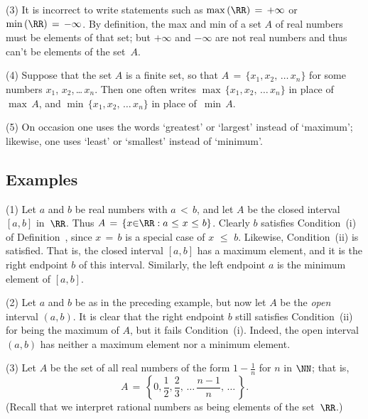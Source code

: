         (3) It is incorrect to write statements such as $\max\,({\RR}) \,=\, +{\infty}$ or $\min\,({\RR}) \,=\, -{\infty}$.
    By definition, the max and min of a set $A$ of real numbers must be elements of that set;
    but $+{\infty}$ and $-{\infty}$ are not real numbers and thus can't be elements of the set~$A$.

\V

        (4) Suppose that the set $A$ is a finite set, so that $A \,=\, \{x_{1}, x_{2}, \,{\ldots}\,x_{n}\}$
    for some numbers $x_{1}$, $x_{2}$,\,{\ldots}\,$x_{n}$. Then one often writes $\max\,\{x_{1}, x_{2},\,{\ldots}\,x_{n}\}$
    in place of~$\max\,A$, and $\min\,\{x_{1}, x_{2},\,{\ldots}\,x_{n}\}$ in place of~$\min\,A$.

\V

        (5) On occasion one uses the words `greatest' or `largest' instead of `maximum'; likewise, one uses `least' or `smallest' instead of `minimum'.

\V


\V
\V

            \subsection{\small{\bf Examples}}
            \label{ExampB30.80}

\V

\hspace*{\parindent}(1) Let $a$ and $b$ be real numbers with $a\,<\,b$, and let $A$ be the closed interval $[a,b]$ in~${\RR}$.
    Thus $A \,=\, \{x{\in}{\RR}: a\,\,{\leq}\,\,x\,\,{\leq}\,\,b\}$.
    Clearly $b$ satisfies Condition~(i) of Definition~, since $x \,=\, b$ is a special case of $x\,\,{\leq}\,\,b$.
    Likewise, Condition~(ii) is satisfied. That is, the closed interval $[a,b]$ has a maximum element, and it is the right endpoint $b$ of this interval.
    Similarly, the left endpoint $a$ is the minimum element of $[a,b]$.

\V

        (2) Let $a$ and $b$ be as in the preceding example, but now let $A$ be the {\em open} interval $(a,b)$.
    It is clear that the right endpoint $b$ still satisfies Condition~(ii) for being the maximum of $A$, but it fails Condition~(i).
    Indeed, the open interval $(a,b)$ has neither a maximum element nor a minimum element.

\V

        (3) Let $A$ be the set of all real numbers of the form ${\displaystyle 1-\frac{1}{n}}$ for $n$ in ${\NN}$;
    that is,
        \begin{displaymath}
        A \,=\, \left\{{\displaystyle 0, \frac{1}{2}, \frac{2}{3},\,{\ldots}\,\frac{n-1}{n},\,{\ldots}\,}\right\}.
        \end{displaymath}
    (Recall that we interpret rational numbers as being elements of the set~${\RR}$.)

